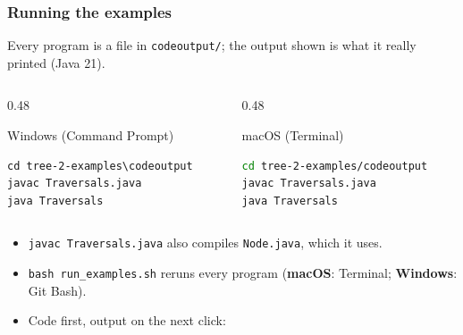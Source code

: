 \documentclass[aspectratio=169,10pt,compress]{beamer}
\newcommand{\win}{\textbf{Windows}}
\newcommand{\mac}{\textbf{macOS}}
\begin{document}
\begin{frame}[t,fragile] \frametitle{Running the examples}
  \small Every program is a file in \texttt{codeoutput/}; the output shown is what it really printed (Java 21).
  \begin{columns}[T]
    \begin{column}{0.48\textwidth}
      \begin{block}{Windows (Command Prompt)}


\begin{lstlisting}[style=codesnippet, language={}, basicstyle=\ttfamily\scriptsize]
cd tree-2-examples\codeoutput
javac Traversals.java
java Traversals
\end{lstlisting}


      \end{block}
    \end{column}
    \begin{column}{0.48\textwidth}
      \begin{block}{macOS (Terminal)}


\begin{lstlisting}[style=codesnippet, language=bash, basicstyle=\ttfamily\scriptsize]
cd tree-2-examples/codeoutput
javac Traversals.java
java Traversals
\end{lstlisting}


      \end{block}
    \end{column}
  \end{columns}

  \begin{itemize}\small
    \item \texttt{javac Traversals.java} also compiles \texttt{Node.java}, which it uses.
    \item \texttt{bash run\_examples.sh} reruns every program (\mac: Terminal; \win: Git Bash).
    \item Code first, output on the next click: 
  \end{itemize}
\end{frame}

\end{document}
